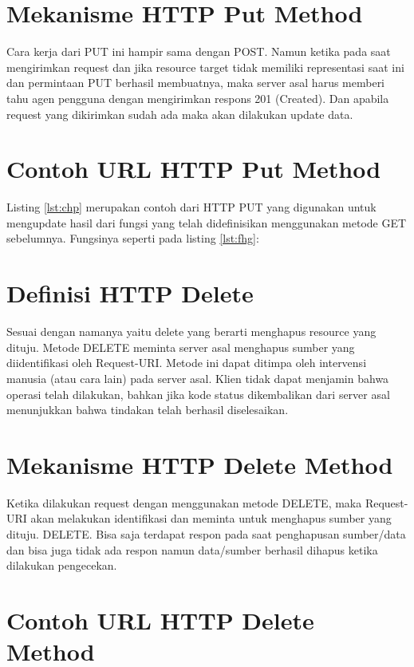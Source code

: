\section{Mekanisme HTTP Put Method}
Cara kerja dari PUT ini hampir sama dengan POST. Namun ketika pada saat mengirimkan request dan jika resource target tidak memiliki representasi saat ini dan permintaan PUT berhasil membuatnya, maka server asal harus memberi tahu agen pengguna dengan mengirimkan respons 201 (Created). Dan apabila request yang dikirimkan sudah ada maka akan dilakukan update data.

\section{Contoh URL HTTP Put Method}


Listing \ref{lst:chp} merupakan contoh dari HTTP PUT yang digunakan untuk mengupdate hasil dari fungsi yang telah didefinisikan menggunakan metode GET sebelumnya. Fungsinya seperti pada listing \ref{lst:fhg}:


\section{Definisi HTTP Delete}
Sesuai dengan namanya yaitu delete yang berarti menghapus resource yang dituju. Metode DELETE meminta server asal menghapus sumber yang diidentifikasi oleh Request-URI. Metode ini dapat ditimpa oleh intervensi manusia (atau cara lain) pada server asal. Klien tidak dapat menjamin bahwa operasi telah dilakukan, bahkan jika kode status dikembalikan dari server asal menunjukkan bahwa tindakan telah berhasil diselesaikan.

\section{Mekanisme HTTP Delete Method}
Ketika dilakukan request dengan menggunakan metode DELETE, maka Request-URI akan melakukan identifikasi dan meminta untuk menghapus sumber yang dituju. DELETE. Bisa saja terdapat respon pada saat penghapusan sumber/data dan bisa juga tidak ada respon namun data/sumber berhasil dihapus ketika dilakukan pengecekan.

\section{Contoh URL HTTP Delete Method}


